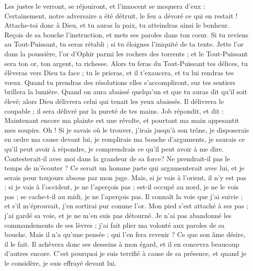 \begin{multicols}{2}
Les justes le verront, se réjouiront, et l'innocent se moquera d'eux :
Certainement, notre adversaire a été détruit, le feu a dévoré ce qui en restait !
Attache-toi donc à Dieu, et tu auras la paix, tu atteindras ainsi le bonheur.
Reçois de sa bouche l'instruction, et mets ses paroles dans ton cœur.
Si tu reviens au Tout-Puissant, tu seras rétabli ; si tu éloignes l'iniquité de ta tente.
Jette l'or dans la poussière, l'or d'Ophir parmi les rochers des torrents ;
et le Tout-Puissant sera ton or, ton argent, ta richesse.
Alors tu feras du Tout-Puissant tes délices, tu élèveras vers Dieu ta face ;
tu le prieras, et il t'exaucera, et tu lui rendras tes vœux.
Quand tu prendras des résolutions elles s'accompliront, sur tes sentiers brillera la lumière.
Quand on aura abaissé quelqu'un et que tu auras dit qu'il soit élevé; alors Dieu délivrera celui qui tenait les yeux abaissés.
Il délivrera le coupable ; il sera délivré par la pureté de tes mains.
\VerseOne{}Job répondit, et dit :
Maintenant encore ma plainte est une révolte, et pourtant ma main appesantit mes soupirs.
Oh ! Si je savais où le trouver, j'irais jusqu'à son trône,
je disposerais en ordre ma cause devant lui, je remplirais ma bouche d'arguments,
je saurais ce qu'il peut avoir à répondre, je comprendrais ce qu'il peut avoir à me dire.
Contesterait-il avec moi dans la grandeur de sa force? Ne prendrait-il pas le temps de m'écouter ?
Ce serait un homme juste qui argumenterait avec lui, et je serais pour toujours absous par mon juge.
Mais, si je vais à l'orient, il n'y est pas ; si je vais à l'occident, je ne l'aperçois pas ;
est-il occupé au nord, je ne le vois pas ; se cache-t-il au midi, je ne l'aperçois pas.
Il connaît la voie que j'ai suivie ; et s'il m'éprouvait, j'en sortirai pur comme l'or.
Mon pied s'est attaché à ses pas ; j'ai gardé sa voie, et je ne m'en suis pas détourné.
Je n'ai pas abandonné les commandements de ses lèvres ; j'ai fait plier ma volonté aux paroles de sa bouche.
Mais il n'a qu'une pensée ; qui l'en fera revenir ? Ce que son âme désire, il le fait.
Il achèvera donc ses desseins à mon égard, et il en concevra beaucoup d'autres encore.
C'est pourquoi je suis terrifié à cause de sa présence, et quand je le considère, je suis effrayé devant lui.

\end{multicols}
